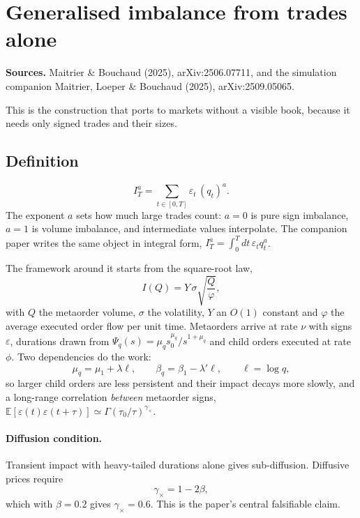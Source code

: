 \documentclass[11pt]{article}
\newcommand{\E}{\mathbb{E}}
\begin{document}
\section{Generalised imbalance from trades alone}\label{sec:genimb}

\textbf{Sources.} Maitrier \& Bouchaud (2025), arXiv:2506.07711, and the
simulation companion Maitrier, Loeper \& Bouchaud (2025), arXiv:2509.05065.

This is the construction that ports to markets without a visible book, because
it needs only signed trades and their sizes.

\subsection{Definition}

\begin{equation}
I^a_T=\sum_{t\in[0,T]}\varepsilon_t\,(q_t)^a .
\end{equation}
The exponent $a$ sets how much large trades count: $a=0$ is pure sign
imbalance, $a=1$ is volume imbalance, and intermediate values interpolate. The
companion paper writes the same object in integral form,
$I^a_T=\int_0^T dt\,\varepsilon_t q_t^a$.

The framework around it starts from the square-root law,
\begin{equation}
I(Q)=Y\,\sigma\sqrt{\frac{Q}{\varphi}},
\end{equation}
with $Q$ the metaorder volume, $\sigma$ the volatility, $Y$ an $O(1)$ constant
and $\varphi$ the average executed order flow per unit time. Metaorders arrive
at rate $\nu$ with signs $\varepsilon$, durations drawn from
$\Psi_q(s)=\mu_q s_0^{\mu_q}/s^{1+\mu_q}$ and child orders executed at rate
$\phi$. Two dependencies do the work:
\begin{equation}
\mu_q=\mu_1+\lambda\ell,
\qquad
\beta_q=\beta_1-\lambda'\ell,
\qquad \ell=\log q,
\end{equation}
so larger child orders are less persistent and their impact decays more slowly,
and a long-range correlation \emph{between} metaorder signs,
$\E[\varepsilon(t)\varepsilon(t+\tau)]\simeq\Gamma(\tau_0/\tau)^{\gamma_\times}$.

\paragraph{Diffusion condition.} Transient impact with heavy-tailed durations
alone gives sub-diffusion. Diffusive prices require
\begin{equation}
\gamma_\times=1-2\beta,
\end{equation}
which with $\beta=0.2$ gives $\gamma_\times=0.6$. This is the paper's central
falsifiable claim.
\end{document}
